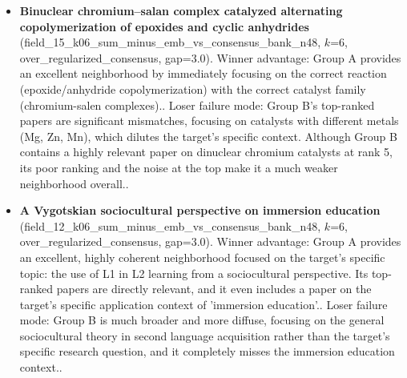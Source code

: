 \begin{itemize}
\item \textbf{Binuclear chromium–salan complex catalyzed alternating copolymerization of epoxides and cyclic anhydrides} (field\_15\_k06\_sum\_minus\_emb\_vs\_consensus\_bank\_n48, $k$=6, over\_regularized\_consensus, gap=3.0). Winner advantage: Group A provides an excellent neighborhood by immediately focusing on the correct reaction (epoxide/anhydride copolymerization) with the correct catalyst family (chromium-salen complexes).. Loser failure mode: Group B's top-ranked papers are significant mismatches, focusing on catalysts with different metals (Mg, Zn, Mn), which dilutes the target's specific context. Although Group B contains a highly relevant paper on dinuclear chromium catalysts at rank 5, its poor ranking and the noise at the top make it a much weaker neighborhood overall..
\item \textbf{A Vygotskian sociocultural perspective on immersion education} (field\_12\_k06\_sum\_minus\_emb\_vs\_consensus\_bank\_n48, $k$=6, over\_regularized\_consensus, gap=3.0). Winner advantage: Group A provides an excellent, highly coherent neighborhood focused on the target's specific topic: the use of L1 in L2 learning from a sociocultural perspective. Its top-ranked papers are directly relevant, and it even includes a paper on the target's specific application context of 'immersion education'.. Loser failure mode: Group B is much broader and more diffuse, focusing on the general sociocultural theory in second language acquisition rather than the target's specific research question, and it completely misses the immersion education context..
\end{itemize}
